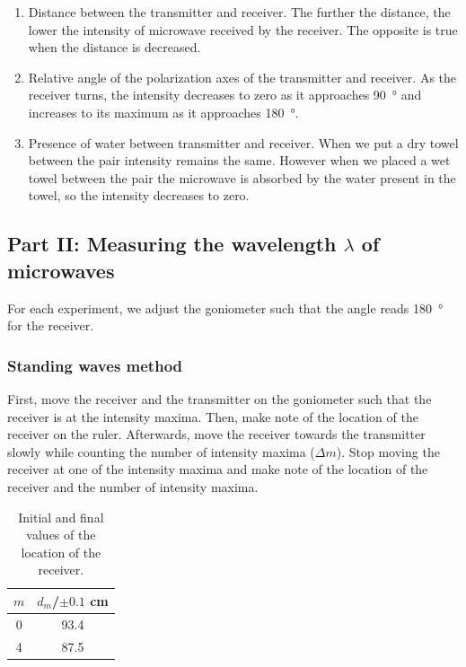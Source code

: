 \documentclass[letter,12pt]{article}
\newcommand{\tlambda}{\(\lambda\) }
\numberwithin{equation}{section}
\numberwithin{figure}{section}
\numberwithin{table}{section}
\begin{document}
\begin{enumerate}
  \item Distance between the transmitter and receiver. The further the distance, the lower the intensity of microwave received by the receiver. The opposite is true when the distance is decreased.
  \item Relative angle of the polarization axes of the transmitter and receiver. As the receiver turns, the intensity decreases to zero as it approaches \SI{90}{\degree} and increases to its maximum as it approaches \SI{180}{\degree}.
  \item Presence of water between transmitter and receiver. When we put a dry towel between the pair intensity remains the same. However when we placed a wet towel between the pair the microwave is absorbed by the water present in the towel, so the intensity decreases to zero.
\end{enumerate}

\subsection{Part II: Measuring the wavelength \tlambda of microwaves}
For each experiment, we adjust the goniometer such that the angle reads \SI{180}{\degree} for the receiver.

\subsubsection{Standing waves method}
First, move the receiver and the transmitter on the goniometer such that the receiver is at the intensity maxima. Then, make note of the location of the receiver on the ruler. Afterwards, move the receiver towards the transmitter slowly while counting the number of intensity maxima (\(\Delta m\)). Stop moving the receiver at one of the intensity maxima and make note of the location of the receiver and the number of intensity maxima. 

\begin{table}[!ht]
  \centering
  \begin{tabular}{cc}
    \toprule
    {\(m\)} & {\(d_m\)/\(\pm 0.1\) \si{\cm}} \\ \midrule
    0 & 93.4 \\
    4 & 87.5 \\
    \bottomrule
  \end{tabular}
  \caption{Initial and final values of the location of the receiver.}
  \label{table:e1}
\end{table}
\end{document}
